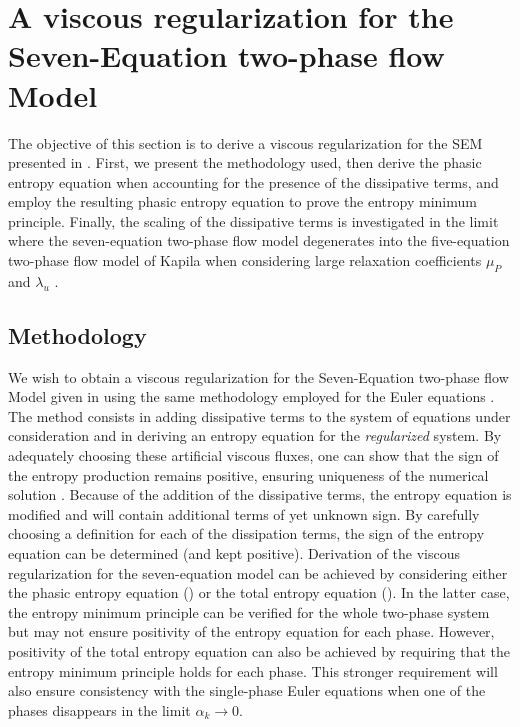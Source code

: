 \documentclass[preprint,10pt]{elsarticle}
\begin{document}
\section{A viscous regularization for the Seven-Equation two-phase flow Model}\label{sec:visc-regu}
%
The objective of this section is to derive a viscous regularization for the SEM presented in . First, we present the methodology used, then derive the phasic entropy equation when accounting for the presence of the dissipative terms, and employ the resulting phasic entropy equation to prove the entropy minimum principle. Finally, the scaling of the dissipative terms is investigated in the limit where the seven-equation two-phase flow model degenerates into the five-equation two-phase flow model of Kapila \cite{Kapila_2001} when considering large relaxation coefficients $\mu_P$ and $\lambda_u$ \cite{dellacherie}.
%
\subsection{Methodology}
%
We wish to obtain a viscous regularization for the Seven-Equation two-phase flow Model given in  using the same methodology employed for the Euler equations \cite{jlg, Marco_paper_low_mach}. The method consists in adding dissipative terms to the system of equations under consideration and in deriving an entropy equation for the {\it regularized} system. By adequately choosing these artificial viscous fluxes, one can show that the sign of the entropy production remains positive, ensuring uniqueness of the numerical solution \cite{Leveque} . Because of the addition of the dissipative terms, the entropy equation is modified and will contain additional terms of yet unknown sign. By carefully choosing a definition for each of the dissipation terms, the sign of the entropy equation can be determined (and kept positive). Derivation of the viscous regularization for the seven-equation model can be achieved by considering either the phasic entropy equation () or the total entropy equation (). In the latter case, the entropy minimum principle can be verified for the whole two-phase system but may not ensure positivity of the entropy equation for each phase. However, positivity of the total entropy equation can also be achieved by requiring that the entropy minimum principle holds for each phase. This stronger requirement will also ensure consistency with the single-phase Euler equations when one of the phases disappears in the limit $\alpha_k \to 0$. 
\end{document}

